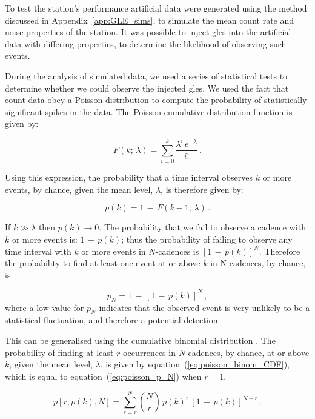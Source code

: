 To test the station's performance artificial data were generated using the method discussed in Appendix~\ref{app:GLE_sims}, to simulate the mean count rate and noise properties of the station. It was possible to inject \glspl{gle} into the artificial data with differing properties, to determine the likelihood of observing such events.

During the analysis of simulated data, we used a series of statistical tests to determine whether we could observe the injected \glspl{gle}. We used the fact that count data obey a Poisson distribution to compute the probability of statistically significant spikes in the data. The Poisson cumulative distribution function is given by:

\begin{equation}
F(k; \, \lambda) = \sum_{i=0}^{k}  \frac{\lambda^i \, e^{-\lambda}}{i!} \, .
\label{eq:poisson_CDF}
\end{equation}


Using this expression, the probability that a time interval observes $k$ or more events, by chance, given the mean level, $\lambda$, is therefore given by: 

\begin{equation}
p(k) = 1 \, - \, F(k-1; \, \lambda) \, .
\label{eq:poisson_SF}
\end{equation}

If $k\gg\lambda$ then $p(k)\to0$. The probability that we fail to observe a cadence with $k$ or more events is: $1 \, - \, p(k)$; thus the probability of failing to observe any time interval with $k$ or more events in $N$-cadences is $[1 \, - \, p(k)]^N$. Therefore the probability to find at least one event at or above $k$ in N-cadences, by chance, is:

\begin{equation}
p_N = 1\, - \, [1 \, - \, p(k)]^N \, ,
\label{eq:poisson_p_N}
\end{equation}
%
where a low value for $p_N$ indicates that the observed event is very unlikely to be a statistical fluctuation, and therefore a potential detection.

This can be generalised using the cumulative binomial distribution \citep{basu_asteroseismic_2017}. The probability of finding at least $r$ occurrences in $N$-cadences, by chance, at or above $k$, given the mean level, $\lambda$, is given by equation~(\ref{eq:poisson_binom_CDF}), which is equal to equation~(\ref{eq:poisson_p_N}) when $r=1$,

\begin{equation}
p[r; p(k), N] = \sum_{r=r}^{N} \binom{N}{r} \, p(k)^r \, [1 \, - \, p(k)]^{N-r} \, .
\label{eq:poisson_binom_CDF}
\end{equation}

